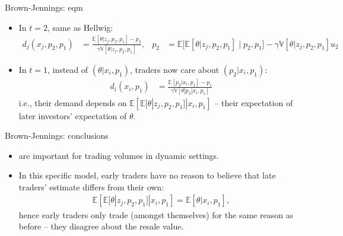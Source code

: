 \documentclass[english,10pt
,aspectratio=169
]{beamer}
\begin{document}
\begin{frame}{Brown-Jennings: eqm}
	\begin{itemize}
		\item \alert<1>{In $t=2$}, same as Hellwig: 
		\begin{align*}
			d_j(x_j,p_2,p_1) &= \frac{\mathbb{E} \left[ \theta | z_j, p_2, p_1\right] - p_2}{\gamma \mathbb{V} \left[ \theta| z_j, p_2, p_1\right]},
			& 
			p_2 &= \mathbb{E} \Big[ \mathbb{E} [\theta|z_j, p_2, p_1] \mid p_2, p_1 \Big] - \gamma \mathbb{V} \left[ \theta| z_j, p_2, p_1\right] u_2
		\end{align*}
		\pause
		\item \alert{In $t=1$}, instead of $(\theta|x_i, p_1)$, traders now care about $(p_2|x_i, p_1)$:
		\begin{align*}
			d_i(x_i,p_1) &= \frac{\mathbb{E} \left[ p_2|x_i, p_1\right] - p_1}{\gamma \mathbb{V} \left[ \theta| p_2|x_i, p_1\right]}
		\end{align*}
		i.e., their \alert{demand depends on} $\mathbb{E} \left[ \mathbb{E} [\theta|z_j, p_2, p_1] | x_i, p_1\right]$ -- their expectation of later investors' expectation of $\theta$.
	\end{itemize}
\end{frame}


\begin{frame}{Brown-Jennings: conclusions}
	\begin{itemize}
		\item {} are important for trading volumes in dynamic settings.
		\item In this specific model, early traders have no reason to believe that late traders' estimate differs from their own:
		\begin{align*}
			\mathbb{E} \left[ \mathbb{E} [\theta|z_j, p_2, p_1] | x_i, p_1\right] = \mathbb{E} \left[ \theta | x_i, p_1\right],
		\end{align*}
		hence early traders only trade (amongst themselves) for the same reason as before -- they \alert{disagree about the resale value}.
	\end{itemize}
\end{frame}
\end{document}
